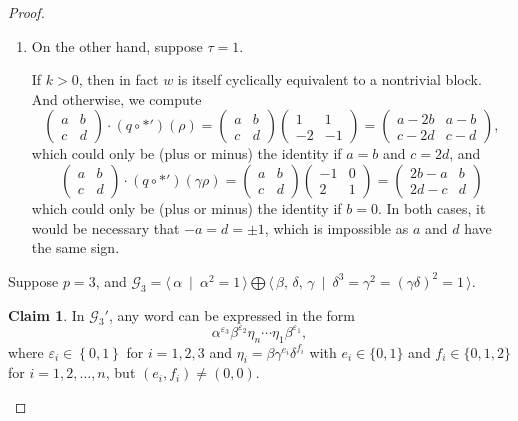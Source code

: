\documentclass{amsart}     %
\newcommand{\set}[1]{ \left\{ #1 \right\} }
\theoremstyle{definition}
\newtheorem{claim}[thm]{Claim}
\begin{document}
\begin{proof}
\begin{description}
\begin{enumerate}
\item On the other hand, suppose $\tau = 1$.

If $k > 0$, then in fact $w$ is itself cyclically equivalent to a nontrivial block. And otherwise, we compute
\[ \begin{pmatrix} a & b \\ c & d \end{pmatrix} \cdot \left(q \circ *'\right) \left( \rho \right) = \begin{pmatrix} a & b \\ c & d \end{pmatrix} \begin{pmatrix} 1 & 1 \\ -2 & -1 \end{pmatrix} = \begin{pmatrix} a-2b & a-b \\ c-2d & c-d \end{pmatrix},\]
which could only be (plus or minus) the identity if $a=b$ and $c=2d$,  
and
\[ \begin{pmatrix} a & b \\ c & d \end{pmatrix} \cdot \left(q \circ *'\right) \left( \gamma \rho \right) = \begin{pmatrix} a & b \\ c & d \end{pmatrix} \begin{pmatrix} -1 & 0 \\ 2 & 1 \end{pmatrix} = \begin{pmatrix} 2b-a & b \\ 2d-c & d \end{pmatrix}\]
which could only be (plus or minus) the identity if $b=0$. In both cases, it would be necessary that $-a = d = \pm1$, which is impossible as $a$ and $d$ have the same sign.
\end{enumerate}



\item[Case 2] Suppose $p = 3$, and $\mathcal{G}_3 = \langle \, \alpha \ \mid \ \alpha^2 = 1 \, \rangle \bigoplus \langle \, \beta, \, \delta, \, \gamma \ \mid \ \delta^3 = \gamma^2 = (\gamma \delta)^2 = 1 \, \rangle$.

\begin{claim}
\label{claim:G3NormalForm} In $\mathcal{G}_3'$, any word can be expressed in the form 
\[\alpha^{\varepsilon_3} \beta^{\varepsilon_2} \eta_n \cdots \eta_1 \beta^{\varepsilon_1},\] where $\varepsilon_i \in \set{0, 1}$ for $i = 1, 2, 3$ and $\eta_i = \beta \gamma^{e_i} \delta^{f_i}$ with $e_i \in \{0,1\}$ and $f_i \in \{0,1,2\}$ for $i = 1, 2, \ldots, n$, but $(e_i, f_i) \neq(0,0)$.
\end{claim}


\end{description}
\end{proof}
\end{document}
